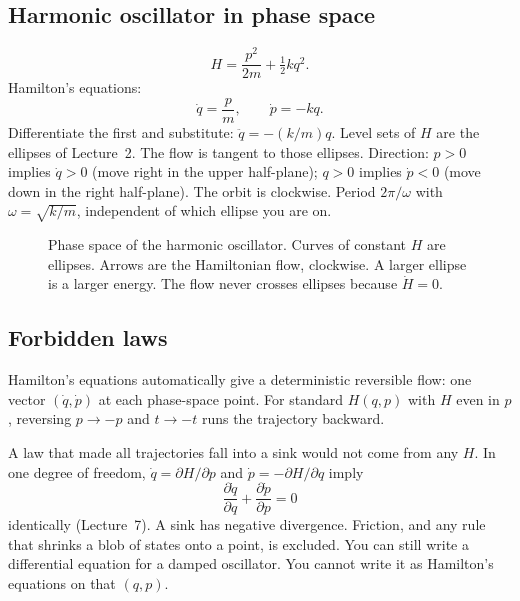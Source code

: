 \documentclass[11pt]{article}
\numberwithin{equation}{section}
\newcommand{\qdot}{\dot{q}}
\newcommand{\pdot}{\dot{p}}
\newcommand{\pd}[2]{\frac{\partial #1}{\partial #2}}
\begin{document}
\subsection{Harmonic oscillator in phase space}

\[
H = \frac{p^2}{2m} + \tfrac12 k q^2.
\]
Hamilton's equations:
\[
\qdot = \frac{p}{m},\qquad \pdot = -k q.
\]
Differentiate the first and substitute: $\ddot q=-(k/m)q$. Level sets of $H$ are the ellipses of Lecture~2. The flow is tangent to those ellipses. Direction: $p>0$ implies $\qdot>0$ (move right in the upper half-plane); $q>0$ implies $\pdot<0$ (move down in the right half-plane). The orbit is clockwise. Period $2\pi/\omega$ with $\omega=\sqrt{k/m}$, independent of which ellipse you are on.

\begin{figure}[ht]
\centering
{}
\caption{Phase space of the harmonic oscillator. Curves of constant $H$ are ellipses. Arrows are the Hamiltonian flow, clockwise. A larger ellipse is a larger energy. The flow never crosses ellipses because $\dot H=0$.}
\end{figure}

\subsection{Forbidden laws}

Hamilton's equations automatically give a deterministic reversible flow: one vector $(\qdot,\pdot)$ at each phase-space point. For standard $H(q,p)$ with $H$ even in $p$, reversing $p\to -p$ and $t\to -t$ runs the trajectory backward.

A law that made all trajectories fall into a sink would not come from any $H$. In one degree of freedom, $\qdot=\partial H/\partial p$ and $\pdot=-\partial H/\partial q$ imply
\[
\pd{\qdot}{q}+\pd{\pdot}{p}=0
\]
identically (Lecture~7). A sink has negative divergence. Friction, and any rule that shrinks a blob of states onto a point, is excluded. You can still write a differential equation for a damped oscillator. You cannot write it as Hamilton's equations on that $(q,p)$.
\end{document}
